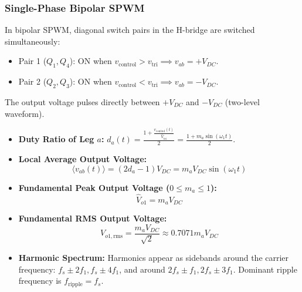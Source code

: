 \subsubsection{Single-Phase Bipolar SPWM}
In bipolar SPWM, diagonal switch pairs in the H-bridge are switched simultaneously:
\begin{itemize}
  \item Pair 1 ($Q_1, Q_4$): ON when $v_{\mathrm{control}} > v_{\mathrm{tri}} \implies v_{ab} = +V_{DC}$.
  \item Pair 2 ($Q_2, Q_3$): ON when $v_{\mathrm{control}} < v_{\mathrm{tri}} \implies v_{ab} = -V_{DC}$.
\end{itemize}
The output voltage pulses directly between $+V_{DC}$ and $-V_{DC}$ (two-level waveform).
\begin{itemize}
  \item \textbf{Duty Ratio of Leg $a$:} $d_a(t) = \frac{1 + \frac{v_{\mathrm{control}}(t)}{\hat{V}_{\mathrm{tri}}}}{2} = \frac{1 + m_a \sin(\omega_1 t)}{2}$.
  \item \textbf{Local Average Output Voltage:}
  \begin{equation}
  \langle v_{ab}(t) \rangle = (2 d_a - 1) V_{DC} = m_a V_{DC} \sin(\omega_1 t)
  \end{equation}
  \item \textbf{Fundamental Peak Output Voltage ($0 \le m_a \le 1$):}
  \begin{equation}
  \hat{V}_{o1} = m_a V_{DC}
  \end{equation}
  \item \textbf{Fundamental RMS Output Voltage:}
  \begin{equation}
  V_{o1,\mathrm{rms}} = \frac{m_a V_{DC}}{\sqrt{2}} \approx 0.7071 m_a V_{DC}
  \end{equation}
  \item \textbf{Harmonic Spectrum:} Harmonics appear as sidebands around the carrier frequency: $f_s \pm 2 f_1, f_s \pm 4 f_1$, and around $2 f_s \pm f_1, 2 f_s \pm 3 f_1$. Dominant ripple frequency is $f_{\mathrm{ripple}} = f_s$.
\end{itemize}

